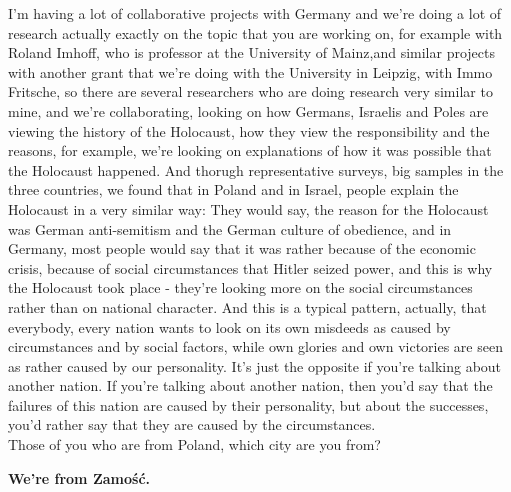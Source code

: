 I'm having a lot of collaborative projects with Germany and we're doing a lot of research actually exactly on the topic that you are working on, for example with Roland Imhoff, who is professor at the University of Mainz,and similar projects with another grant that we're doing with the University in Leipzig, with Immo Fritsche, so there are several researchers who are doing research very similar to mine, and we're collaborating, looking on how Germans, Israelis and Poles are viewing the history of the Holocaust, how they view the responsibility and the reasons, for example, we're looking on explanations of how it was possible that the Holocaust happened. And thorugh representative surveys, big samples in the three countries, we found that in Poland and in Israel, people explain the Holocaust in a very similar way: They would say, the reason for the Holocaust was German anti-semitism and the German culture of obedience, and in Germany, most people would say that it was rather because of the economic crisis, because of social circumstances that Hitler seized power, and this is why the Holocaust took place - they're looking more on the social circumstances rather than on national character. And this is a typical pattern, actually, that everybody, every nation wants to look on its own misdeeds as caused by circumstances and by social factors, while own glories and own victories are seen as rather caused by our personality. It's just the opposite if you're talking about another nation. If you're talking about another nation, then you'd say that the failures of this nation are caused by their personality, but about the successes, you'd rather say that they are caused by the circumstances.\\
Those of you who are from Poland, which city are you from? 

\textbf{We're from Zamość.}

